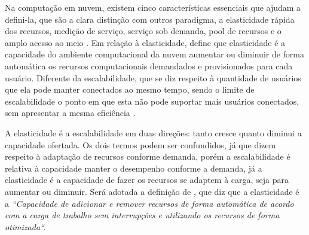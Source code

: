 \documentclass[twoside,english,brazilian]{UNISINOSartigo}
\begin{document}
Na computação em nuvem, existem cinco características essenciais que ajudam a defini-la, que são a clara distinção com outros paradigma, a elasticidade rápida dos recursos, medição de serviço, serviço sob demanda, pool de recursos e o amplo acesso ao meio \cite{Moreira2010}. Em relação à elasticidade,  define que elasticidade é a capacidade do ambiente computacional da nuvem aumentar ou diminuir de forma automática os recursos computacionais demandados e provisionados para cada usuário. Diferente da escalabilidade, que se diz respeito à quantidade de usuários que ela pode manter conectados ao mesmo tempo, sendo o limite de escalabilidade o ponto em que esta não pode suportar mais usuários conectados, sem apresentar a mesma  eficiência \cite{Wilder12}. 

A elasticidade é a escalabilidade em duas direções: tanto cresce quanto diminui a capacidade ofertada. Os dois termos podem ser confundidos, já que dizem respeito à adaptação de recursos conforme demanda, porém a escalabilidade é relativa à capacidade manter o desempenho conforme a demanda, já a elasticidade é a capacidade de fazer os recursos se adaptem à carga, seja para aumentar ou diminuir. 
Será adotada a definição de , que diz que a elasticidade é a \textit{``Capacidade de adicionar e remover recursos de forma automática de acordo com a carga de trabalho sem interrupções e utilizando os recursos de forma otimizada``.}
\end{document}
